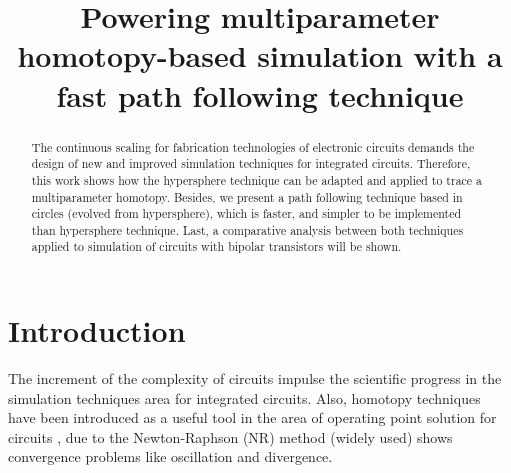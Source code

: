 \documentclass[conference,letterpaper,onecolumn]{IEEEtran}
\begin{document}
\title{Powering multiparameter homotopy-based simulation with a fast path following technique}

\author{
}

\maketitle

\begin{abstract}
The continuous scaling for fabrication technologies of electronic circuits demands the design of new and improved simulation techniques for integrated circuits. Therefore,
this work shows how the hypersphere technique can be adapted and applied to trace a multiparameter homotopy. Besides, we present a path following technique based in circles (evolved from hypersphere), which is faster, and simpler to be implemented than hypersphere technique. Last, a comparative analysis between both techniques applied to simulation of circuits with bipolar transistors will be shown.
\end{abstract}
 
\section{Introduction} 
The increment of the complexity of circuits impulse the scientific progress in the simulation techniques area for integrated circuits. Also, homotopy techniques have been introduced as a useful tool in the area of operating point solution for circuits \cite{homo_green05,homo_ArtificialP,homo_coercitivo,homo_iscas05,homo_MOS}, due to the Newton-Raphson (NR) method (widely used) shows convergence problems \cite{NEWTONR} like oscillation and divergence.
\end{document}
